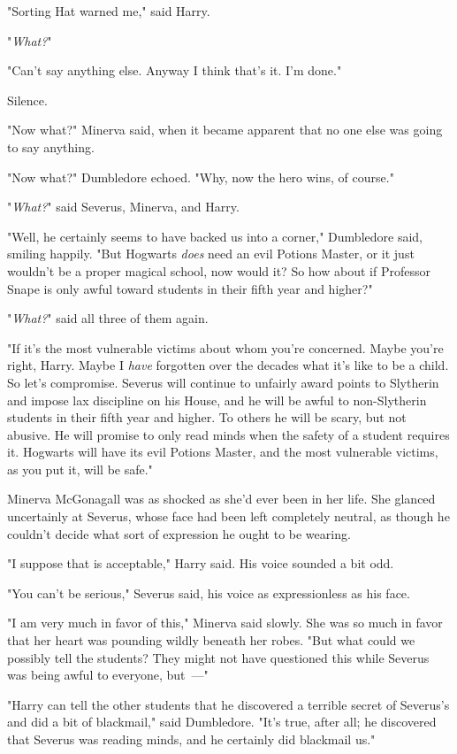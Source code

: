 "Sorting Hat warned me," said Harry.

"\emph{What?}"

"Can't say anything else. Anyway I think that's it. I'm done."

Silence.

"Now what?" Minerva said, when it became apparent that no one else was going to
say anything.

"Now what?" Dumbledore echoed. "Why, now the hero wins, of course."

"\emph{What?}" said Severus, Minerva, and Harry.

"Well, he certainly seems to have backed us into a corner," Dumbledore said,
smiling happily. "But Hogwarts \emph{does} need an evil Potions Master, or it
just wouldn't be a proper magical school, now would it? So how about if
Professor Snape is only awful toward students in their fifth year and higher?"

"\emph{What?}" said all three of them again.

"If it's the most vulnerable victims about whom you're concerned. Maybe you're
right, Harry. Maybe I \emph{have} forgotten over the decades what it's like to
be a child. So let's compromise. Severus will continue to unfairly award points
to Slytherin and impose lax discipline on his House, and he will be awful to
non-Slytherin students in their fifth year and higher. To others he will be
scary, but not abusive. He will promise to only read minds when the safety of a
student requires it. Hogwarts will have its evil Potions Master, and the most
vulnerable victims, as you put it, will be safe."

Minerva McGonagall was as shocked as she'd ever been in her life. She glanced
uncertainly at Severus, whose face had been left completely neutral, as though
he couldn't decide what sort of expression he ought to be wearing.

"I suppose that is acceptable," Harry said. His voice sounded a bit odd.

"You can't be serious," Severus said, his voice as expressionless as his face.

"I am very much in favor of this," Minerva said slowly. She was so much in
favor that her heart was pounding wildly beneath her robes. "But what could we
possibly tell the students? They might not have questioned this while Severus
was{\el} being awful to everyone, but~---"

"Harry can tell the other students that he discovered a terrible secret of
Severus's and did a bit of blackmail," said Dumbledore. "It's true, after all;
he discovered that Severus was reading minds, and he certainly did blackmail
us."

